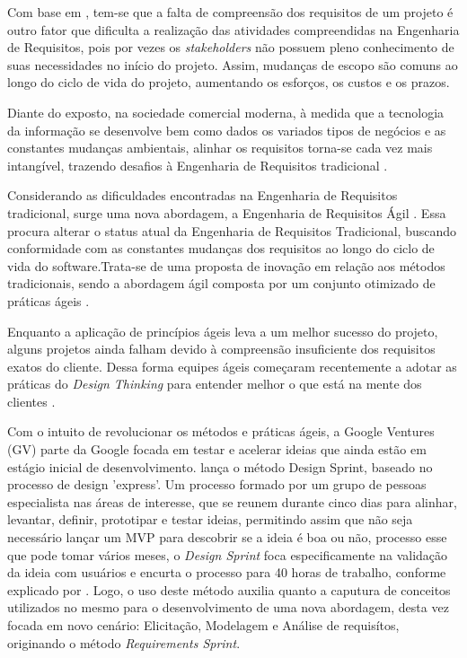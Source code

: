 Com base em \cite{lampa2017project}, tem-se que a falta de compreensão dos requisitos de um projeto é outro fator que dificulta a realização das atividades compreendidas na Engenharia de Requisitos, pois por vezes os \textit{stakeholders} não possuem pleno conhecimento de suas necessidades no início do projeto. Assim, mudanças de escopo são comuns ao longo do ciclo de vida do projeto, aumentando os esforços, os custos e os prazos. 

Diante do exposto, na sociedade comercial moderna, à medida que a tecnologia da informação se desenvolve bem como dados os variados tipos de negócios e as constantes mudanças ambientais, alinhar os requisitos torna-se cada vez mais intangível, trazendo desafios à Engenharia de Requisitos tradicional \cite{jun2010application}.

Considerando as dificuldades encontradas na Engenharia de Requisitos tradicional, surge uma nova abordagem, a Engenharia de Requisitos Ágil \cite{jun2010application}. Essa procura alterar o status atual da Engenharia de Requisitos Tradicional, buscando conformidade com as constantes mudanças dos requisitos ao longo do ciclo de vida do software.Trata-se de uma proposta de inovação em relação aos métodos tradicionais, sendo a abordagem ágil composta por um conjunto otimizado de práticas ágeis \cite{jun2010application}. 

Enquanto a aplicação de princípios ágeis leva a um melhor sucesso do projeto, alguns projetos ainda falham devido à compreensão insuficiente dos requisitos exatos do cliente. Dessa forma equipes ágeis começaram recentemente a adotar as práticas do \textit{Design Thinking} para entender melhor o que está na mente dos clientes \cite{prasad2018adopting}.

Com o intuito de revolucionar os métodos e práticas ágeis, a Google Ventures (GV) parte da Google focada em testar e acelerar ideias que ainda estão em estágio inicial de desenvolvimento. lança o método Design Sprint, baseado no processo de design 'express'. Um processo formado por um grupo de pessoas especialista nas áreas de interesse, que se reunem durante cinco dias para alinhar, levantar, definir, prototipar e testar ideias, permitindo assim que não seja necessário lançar um MVP para descobrir se a ideia é boa ou não, processo esse que pode tomar vários meses, o  \textit{Design Sprint} foca especificamente na validação da ideia com usuários e encurta o processo para 40 horas de trabalho, conforme explicado por \cite{knapp2016sprint}. Logo, o uso deste método auxilia quanto a caputura de conceitos utilizados no mesmo para o desenvolvimento de uma nova abordagem, desta vez focada em novo cenário: Elicitação, Modelagem e Análise de requisítos, originando o método \textit{Requirements Sprint}.

